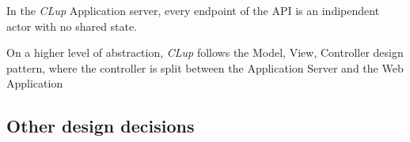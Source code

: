 In the \emph{CLup} Application server, every endpoint of the API is an indipendent actor with no shared state.

On a higher level of abstraction, \emph{CLup} follows the Model, View, Controller design pattern, where the controller is split between the Application Server and the Web Application

\subsection{Other design decisions}
